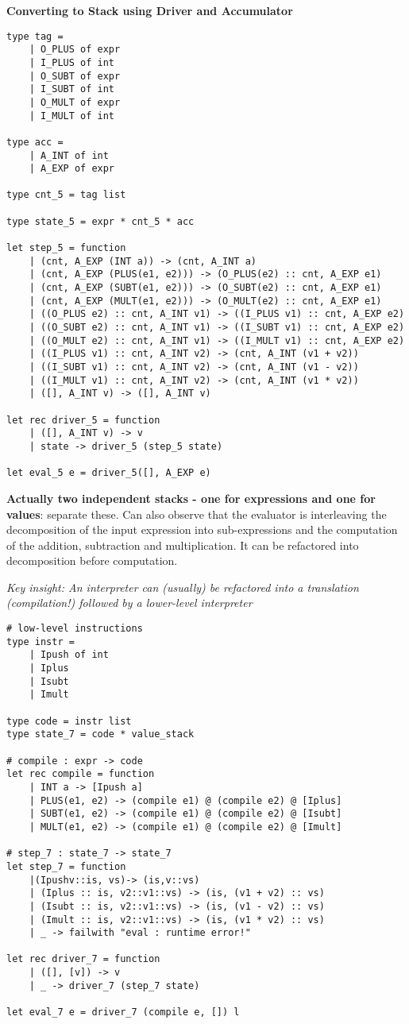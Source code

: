 \documentclass{article}
\begin{document}
\noindent
\textbf{Converting to Stack using Driver and Accumulator}
\begin{lstlisting}
type tag =
	| O_PLUS of expr 
	| I_PLUS of int
	| O_SUBT of expr 
	| I_SUBT of int
	| O_MULT of expr
	| I_MULT of int

type acc =
	| A_INT of int
	| A_EXP of expr

type cnt_5 = tag list

type state_5 = expr * cnt_5 * acc

let step_5 = function
	| (cnt, A_EXP (INT a)) -> (cnt, A_INT a)
	| (cnt, A_EXP (PLUS(e1, e2))) -> (O_PLUS(e2) :: cnt, A_EXP e1)
	| (cnt, A_EXP (SUBT(e1, e2))) -> (O_SUBT(e2) :: cnt, A_EXP e1)
	| (cnt, A_EXP (MULT(e1, e2))) -> (O_MULT(e2) :: cnt, A_EXP e1)
	| ((O_PLUS e2) :: cnt, A_INT v1) -> ((I_PLUS v1) :: cnt, A_EXP e2) 
	| ((O_SUBT e2) :: cnt, A_INT v1) -> ((I_SUBT v1) :: cnt, A_EXP e2) 
	| ((O_MULT e2) :: cnt, A_INT v1) -> ((I_MULT v1) :: cnt, A_EXP e2)
	| ((I_PLUS v1) :: cnt, A_INT v2) -> (cnt, A_INT (v1 + v2))
	| ((I_SUBT v1) :: cnt, A_INT v2) -> (cnt, A_INT (v1 - v2))
	| ((I_MULT v1) :: cnt, A_INT v2) -> (cnt, A_INT (v1 * v2))
	| ([], A_INT v) -> ([], A_INT v)
	 
let rec driver_5 = function
	| ([], A_INT v) -> v
	| state -> driver_5 (step_5 state)

let eval_5 e = driver_5([], A_EXP e)
\end{lstlisting}

\bigskip
\noindent
\textbf{Actually two independent stacks - one for expressions and one for values}: separate these. Can also observe that the evaluator is interleaving the decomposition of the input expression into sub-expressions and the computation of the addition, subtraction and multiplication. It can be refactored into decomposition before computation.

\textit{Key insight: An interpreter can (usually) be refactored into a translation (compilation!) followed by a lower-level interpreter}
\begin{lstlisting}
# low-level instructions 
type instr =
	| Ipush of int 
	| Iplus
	| Isubt
	| Imult
	
type code = instr list
type state_7 = code * value_stack

# compile : expr -> code 
let rec compile = function
	| INT a -> [Ipush a]
	| PLUS(e1, e2) -> (compile e1) @ (compile e2) @ [Iplus]
	| SUBT(e1, e2) -> (compile e1) @ (compile e2) @ [Isubt]
	| MULT(e1, e2) -> (compile e1) @ (compile e2) @ [Imult]

# step_7 : state_7 -> state_7 
let step_7 = function
	|(Ipushv::is, vs)-> (is,v::vs)
	| (Iplus :: is, v2::v1::vs) -> (is, (v1 + v2) :: vs) 
	| (Isubt :: is, v2::v1::vs) -> (is, (v1 - v2) :: vs) 
	| (Imult :: is, v2::v1::vs) -> (is, (v1 * v2) :: vs) 
	| _ -> failwith "eval : runtime error!"
	
let rec driver_7 = function
	| ([], [v]) -> v
	| _ -> driver_7 (step_7 state)
	
let eval_7 e = driver_7 (compile e, []) l

\end{lstlisting}
\end{document}
